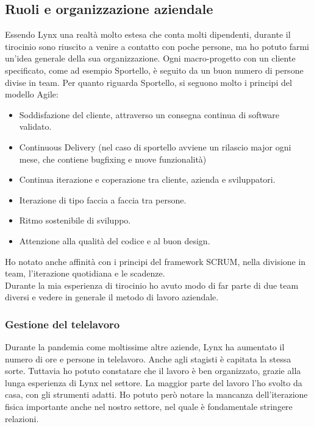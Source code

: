 \subsection{Ruoli e organizzazione aziendale}
Essendo Lynx una realtà molto estesa che conta molti dipendenti, durante il tirocinio sono riuscito a venire a contatto con poche persone, ma ho potuto farmi un'idea generale della sua organizzazione. Ogni macro-progetto con un cliente specificato, come ad esempio Sportello, è seguito da un buon numero di persone divise in team. Per quanto riguarda Sportello, si seguono molto i principi del modello Agile:
\begin{itemize}
	\item Soddisfazione del cliente, attraverso un consegna continua di software validato.
	\item Continuous Delivery (nel caso di sportello avviene un rilascio major ogni mese, che contiene bugfixing e nuove funzionalità)
	\item Continua iterazione e coperazione tra cliente, azienda e sviluppatori.
	\item Iterazione di tipo faccia a faccia tra persone.
	\item Ritmo sostenibile di sviluppo.
	\item Attenzione alla qualità del codice e al buon design.
\end{itemize}
Ho notato anche affinità con i principi del framework SCRUM, nella divisione in team, l'iterazione quotidiana e le scadenze.\\
Durante la mia esperienza di tirocinio ho avuto modo di far parte di due team diversi e vedere in generale il metodo di lavoro aziendale. 

\subsubsection{Gestione del telelavoro}
Durante la pandemia come moltissime altre aziende, Lynx ha aumentato il numero di ore e persone in telelavoro. Anche agli stagisti è capitata la stessa sorte. Tuttavia ho potuto constatare che il lavoro è ben organizzato, grazie alla lunga esperienza di Lynx nel settore.
La maggior parte del lavoro l'ho svolto da casa, con gli strumenti adatti. Ho potuto però notare la mancanza dell'iterazione fisica importante anche nel nostro settore, nel quale è fondamentale stringere relazioni.
